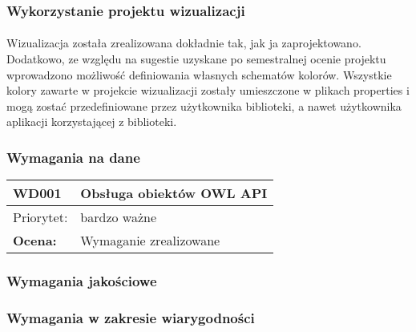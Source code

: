 \subsubsection{Wykorzystanie projektu wizualizacji}

\paragraph{} Wizualizacja została zrealizowana dokładnie tak, jak ja zaprojektowano. Dodatkowo, ze względu na sugestie uzyskane po semestralnej ocenie projektu wprowadzono możliwość definiowania własnych schematów kolorów. Wszystkie kolory zawarte w projekcie wizualizacji zostały umieszczone w plikach properties i mogą zostać przedefiniowane przez użytkownika biblioteki, a nawet użytkownika aplikacji korzystającej z biblioteki.


\subsubsection{Wymagania na dane}


\begin{center}

\begin{tabular}{|m{3cm}|m{9cm}|} \hline

WD001 & Obsługa obiektów OWL API \\ \hline
Priorytet: &  bardzo ważne \\ \hline
\textbf{Ocena:} & Wymaganie zrealizowane\\ \hline
\end{tabular}

\end{center}

\subsubsection{Wymagania jakościowe}


\subsubsection{Wymagania w zakresie wiarygodności}

